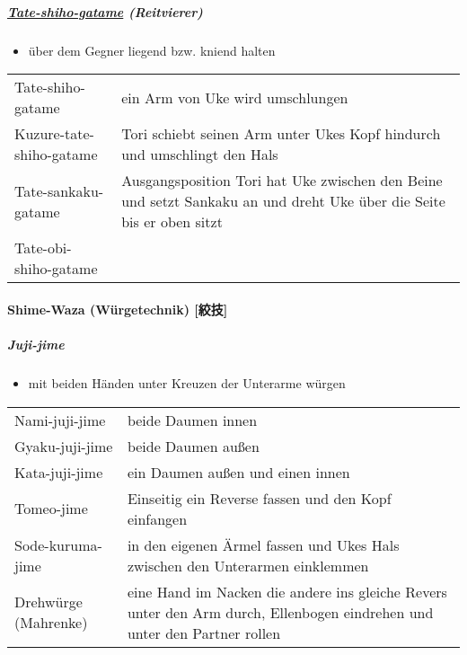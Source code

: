 \documentclass[justified, a4paper, notitlepage, captions=tableheading, nobib]{tufte-handout}
\begin{document}
\subparagraph{\hyperref[orgba85929]{Tate-shiho-gatame} (Reitvierer)}
\label{sec:org7896055}

\begin{itemize}
\item über dem Gegner liegend bzw. kniend halten
\end{itemize}

\begin{center}
\begin{tabular}{ll}
\label{orgba85929}Tate-shiho-gatame & ein Arm von Uke wird umschlungen\\
\label{org7a48a8c}Kuzure-tate-shiho-gatame & Tori schiebt seinen Arm unter Ukes Kopf hindurch und umschlingt den Hals\\
\label{org42a968a}Tate-sankaku-gatame & Ausgangsposition Tori hat Uke zwischen den Beine und setzt Sankaku an und dreht Uke über die Seite bis er oben sitzt\\
\label{org20aeb12}Tate-obi-shiho-gatame & \\
\end{tabular}
\end{center}

\paragraph{Shime-Waza (Würgetechnik) [絞技] }
\label{sec:orgc68a2ea}

\subparagraph{Juji-jime}
\label{sec:orgc73c471}
\begin{itemize}
\item mit beiden Händen unter Kreuzen der Unterarme würgen
\end{itemize}

\begin{center}
\begin{tabular}{ll}
\label{org9cbf22e}Nami-juji-jime & beide Daumen innen\\
\label{org6766ded}Gyaku-juji-jime & beide Daumen außen\\
\label{org0e27812}Kata-juji-jime & ein Daumen außen und einen innen\\
\label{orgcbb3845}Tomeo-jime & Einseitig ein Reverse fassen und den Kopf einfangen\\
\label{orgca7fe31}Sode-kuruma-jime & in den eigenen Ärmel fassen und Ukes Hals zwischen den Unterarmen einklemmen\\
\label{org7eb3e53}Drehwürge (Mahrenke) & eine Hand im Nacken die andere ins gleiche Revers unter den Arm durch, Ellenbogen eindrehen und unter den Partner rollen\\
\end{tabular}
\end{center}
\end{document}
